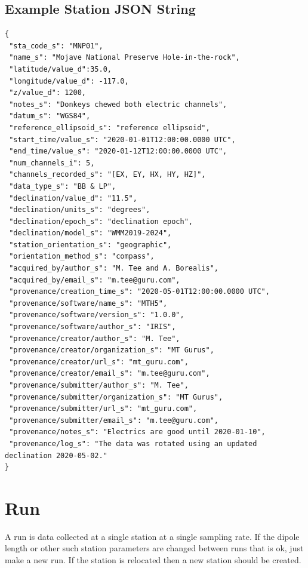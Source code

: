 \documentclass{article}
\begin{document}
\newpage
\subsection{Example Station JSON String}

\begin{verbatim}
{
 "sta_code_s": "MNP01",
 "name_s": "Mojave National Preserve Hole-in-the-rock",
 "latitude/value_d":35.0,
 "longitude/value_d": -117.0,
 "z/value_d": 1200,
 "notes_s": "Donkeys chewed both electric channels",
 "datum_s": "WGS84",
 "reference_ellipsoid_s": "reference ellipsoid",
 "start_time/value_s": "2020-01-01T12:00:00.0000 UTC",
 "end_time/value_s": "2020-01-12T12:00:00.0000 UTC",
 "num_channels_i": 5,
 "channels_recorded_s": "[EX, EY, HX, HY, HZ]",
 "data_type_s": "BB & LP",
 "declination/value_d": "11.5",
 "declination/units_s": "degrees",
 "declination/epoch_s": "declination epoch",
 "declination/model_s": "WMM2019-2024",
 "station_orientation_s": "geographic",
 "orientation_method_s": "compass",
 "acquired_by/author_s": "M. Tee and A. Borealis",
 "acquired_by/email_s": "m.tee@guru.com",
 "provenance/creation_time_s": "2020-05-01T12:00:00.0000 UTC",
 "provenance/software/name_s": "MTH5",
 "provenance/software/version_s": "1.0.0",
 "provenance/software/author_s": "IRIS",
 "provenance/creator/author_s": "M. Tee",
 "provenance/creator/organization_s": "MT Gurus",
 "provenance/creator/url_s": "mt_guru.com",
 "provenance/creator/email_s": "m.tee@guru.com",
 "provenance/submitter/author_s": "M. Tee",
 "provenance/submitter/organization_s": "MT Gurus",
 "provenance/submitter/url_s": "mt_guru.com",
 "provenance/submitter/email_s": "m.tee@guru.com",
 "provenance/notes_s": "Electrics are good until 2020-01-10",
 "provenance/log_s": "The data was rotated using an updated declination 2020-05-02."
}
\end{verbatim}

\newpage
\section{Run}

A run is data collected at a single station at a single sampling rate.  If the dipole length or other such station parameters are changed between runs that is ok, just make a new run.  If the station is relocated then a new station should be created.
\end{document}
